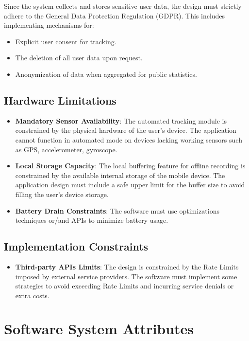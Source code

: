 Since the system collects and stores sensitive user data, the design must strictly adhere to the General Data Protection Regulation (GDPR). This includes implementing mechanisms for:
\begin{itemize}
    \item Explicit user consent for tracking.
    \item The deletion of all user data upon request.
    \item Anonymization of data when aggregated for public statistics.
\end{itemize}

\subsection{Hardware Limitations}

\begin{itemize}
    \item \textbf{Mandatory Sensor Availability}: The automated tracking module is constrained by the physical hardware of the user's device. The application cannot function in automated mode on devices lacking working sensors such as GPS, accelerometer, gyroscope.

    \item \textbf{Local Storage Capacity}: The local buffering feature for offline recording is constrained by the available internal storage of the mobile device. The application design must include a safe upper limit for the buffer size to avoid filling the user's device storage.

    \item \textbf{Battery Drain Constraints}: The software must use optimizations techniques or/and APIs to minimize battery usage.
\end{itemize}

\subsection{Implementation Constraints}

\begin{itemize}
    \item \textbf{Third-party APIs Limits}: The design is constrained by the Rate Limits imposed by external service providers. The software must implement some strategies to avoid exceeding Rate Limits and incurring service denials or extra costs.
\end{itemize}

\section{Software System Attributes}
\label{sec:attributes}


